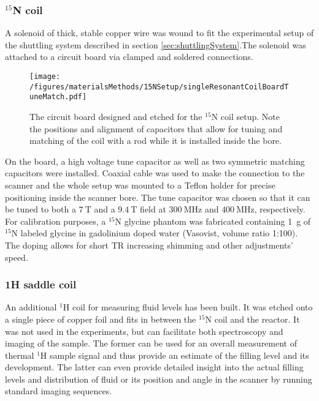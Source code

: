             \subsubsection{$^{15}$N coil}
            \label{sec:matMeth:15Ncoil}
            A solenoid of thick, stable copper wire was wound to fit the experimental setup of the shuttling system described in section \ref{sec:shuttlingSystem}.The solenoid was attached to a circuit board via clamped and soldered connections.
                \begin{wrapfigure}{rb}{0.5\textwidth}
                    \label{figure:matMeth:15NcircuitBoard}
                    \texttt{[image: /figures/materialsMethods/15NSetup/singleResonantCoilBoardTuneMatch.pdf]}
                    \caption[$^{15}$N circuit board]{The circuit board designed and etched for the $^{15}$N coil setup. Note the positions and alignment of capacitors that allow for tuning and matching of the coil with a rod while it is installed inside the bore.}
                \end{wrapfigure}
                  On the board, a high voltage tune capacitor as well as two symmetric matching capacitors were installed. Coaxial cable was used to make the connection to the scanner and the whole setup was mounted to a Teflon holder for precise positioning inside the scanner bore. The tune capacitor was chosen so that it can be tuned to both a $\SI{7}{\tesla}$ and a $\SI{9.4}{\tesla}$ field at $\SI{300}{\MHz}$ and $\SI{400}{\MHz}$, respectively.
                For calibration purposes, a $^{15}$N glycine phantom was fabricated containing \SI{1}{\gram} of $^{15}$N labeled glycine in gadolinium  doped water (Vasovist, volume ratio 1:100). The doping allows for short TR increasing shimming and other adjustments' speed.
            \subsubsection{1H saddle coil} 
            An additional $^{1}$H coil for measuring fluid levels has been built. It was etched onto a single piece of copper foil and fits in between the $^{15}$N coil and the reactor. It was not used in the experiments, but can facilitate both spectroscopy and imaging of the sample. The former can be used for an overall measurement of thermal $^{1}$H sample signal and thus provide an estimate of the filling level and its development. The latter can even provide detailed insight into the actual filling levels and distribution of fluid or its position and angle in the scanner by running standard imaging sequences.

